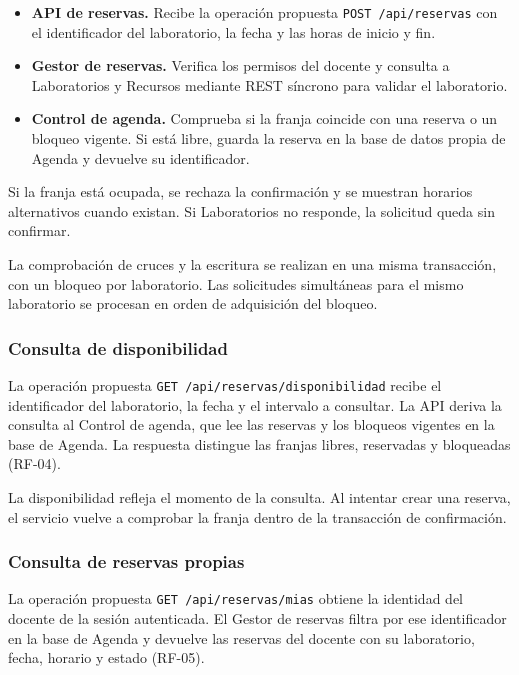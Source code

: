 \begin{itemize}
  \item \textbf{API de reservas.} Recibe la operación propuesta
    \texttt{POST /api/reservas} con el identificador del laboratorio,
    la fecha y las horas de inicio y fin.
  \item \textbf{Gestor de reservas.} Verifica los permisos del docente
    y consulta a Laboratorios y Recursos mediante REST síncrono para
    validar el laboratorio.
  \item \textbf{Control de agenda.} Comprueba si la franja coincide con
    una reserva o un bloqueo vigente. Si está libre, guarda la reserva
    en la base de datos propia de Agenda y devuelve su identificador.
\end{itemize}

Si la franja está ocupada, se rechaza la confirmación y se muestran
horarios alternativos cuando existan. Si Laboratorios no responde,
la solicitud queda sin confirmar.

La comprobación de cruces y la escritura se realizan en una misma
transacción, con un bloqueo por laboratorio. Las solicitudes simultáneas
para el mismo laboratorio se procesan en orden de adquisición del bloqueo.

\subsubsection{Consulta de disponibilidad}

La operación propuesta \texttt{GET /api/reservas/disponibilidad} recibe
el identificador del laboratorio, la fecha y el intervalo a consultar.
La API deriva la consulta al Control de agenda, que lee las reservas y
los bloqueos vigentes en la base de Agenda. La respuesta distingue las
franjas libres, reservadas y bloqueadas (RF-04).

La disponibilidad refleja el momento de la consulta. Al intentar crear
una reserva, el servicio vuelve a comprobar la franja dentro de la
transacción de confirmación.

\subsubsection{Consulta de reservas propias}

La operación propuesta \texttt{GET /api/reservas/mias} obtiene la identidad
del docente de la sesión autenticada. El Gestor de reservas filtra por ese
identificador en la base de Agenda y devuelve las reservas del docente con su
laboratorio, fecha, horario y estado (RF-05).

